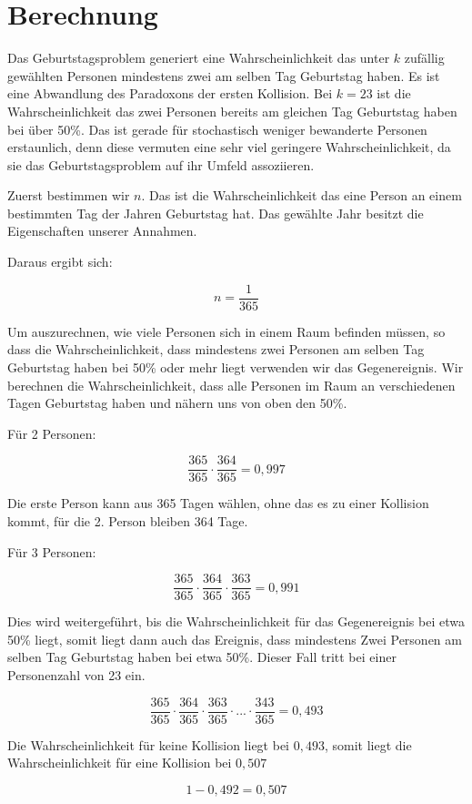 \documentclass[../main.tex]{subfiles}
\begin{document}
\section{Berechnung}

Das Geburtstagsproblem generiert eine Wahrscheinlichkeit das unter \(k\) zufällig gewählten Personen mindestens zwei am
selben Tag Geburtstag haben. Es ist eine Abwandlung des Paradoxons der ersten Kollision. \cite{henze} Bei \(k=23\) ist die
Wahrscheinlichkeit das zwei Personen bereits am gleichen Tag Geburtstag haben bei über 50\%. Das ist gerade für
stochastisch weniger bewanderte Personen erstaunlich, denn diese vermuten eine sehr viel geringere Wahrscheinlichkeit,
da sie das Geburtstagsproblem auf ihr Umfeld assoziieren.

Zuerst bestimmen wir \(n\). Das ist die Wahrscheinlichkeit das eine Person an einem bestimmten Tag der Jahren Geburtstag hat.
Das gewählte Jahr besitzt die Eigenschaften unserer Annahmen.

Daraus ergibt sich:

\begin{equation}
n = \frac{1}{365}
\end{equation}

Um auszurechnen, wie viele Personen sich in einem Raum befinden müssen, so dass die Wahrscheinlichkeit,
dass mindestens zwei Personen am selben Tag Geburtstag haben bei 50\% oder mehr liegt verwenden wir das Gegenereignis.
Wir berechnen die Wahrscheinlichkeit, dass alle Personen im Raum an verschiedenen Tagen Geburtstag haben und nähern uns
von oben den 50\%.

Für 2 Personen:

\begin{equation}
 \frac{365}{365} \cdot \frac{364}{365} = 0,997
\end{equation}

Die erste Person kann aus 365 Tagen wählen, ohne das es zu einer Kollision kommt, für die 2. Person bleiben 364 Tage.

Für 3 Personen:

\begin{equation}
 \frac{365}{365} \cdot \frac{364}{365} \cdot \frac{363}{365} = 0,991
\end{equation}

Dies wird weitergeführt, bis die Wahrscheinlichkeit für das Gegenereignis bei etwa 50\% liegt, somit liegt dann
auch das Ereignis, dass mindestens Zwei Personen am selben Tag Geburtstag haben bei etwa 50\%. Dieser
Fall tritt bei einer Personenzahl von 23 ein.

\begin{equation}
 \frac{365}{365} \cdot \frac{364}{365} \cdot \frac{363}{365} \cdot ... \cdot \frac{343}{365} = 0,493
\end{equation}

Die Wahrscheinlichkeit für keine Kollision liegt bei $0,493$, somit liegt die Wahrscheinlichkeit für eine Kollision bei $0,507$

\begin{equation}
 1-0,492 = 0,507
\end{equation}
\end{document}
